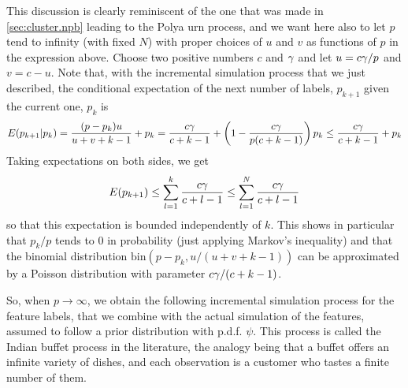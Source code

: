 \bigskip

This discussion is clearly reminiscent of the one that was made in \cref{sec:cluster.npb} leading to the Polya urn process, and we want here also to let $p$ tend to infinity (with fixed $N$) with proper choices of $u$ and $v$ as functions of $p$ in the expression above. Choose two positive numbers $c$ and $\gamma$ and let $u = c\gamma/p$ and $v = c - u$. Note that, with the incremental simulation process that we just described, the conditional expectation of the next number of labels, $p_{k+1}$ given the current one, $p_k$ is
\[
E(p_{k+1}|p_k) = \frac{(p-p_k)u}{u+v+k-1} + p_k = \frac{c\gamma}{c+k-1} + \left(1- \frac{c\gamma}{p(c+k-1)}\right) p_k\leq \frac{c\gamma}{c+k-1} + p_k 
\]
Taking expectations on both sides, we get 
\[
E(p_{k+1}) \leq \sum_{l=1}^k \frac{c\gamma}{c+l-1} \leq  \sum_{l=1}^N \frac{c\gamma}{c+l-1}
\]
so that this expectation is bounded independently of $k$. This shows in particular that $p_k/p$ tends to 0 in probability (just applying Markov's inequality) and that the binomial distribution $\mathrm{bin}(p-p_k, u/(u+v+k-1))$ can be approximated by a Poisson distribution with parameter $c\gamma / (c+k-1)$. 

So, when $p\to \infty$, we obtain the following incremental simulation process for the feature labels, that we combine with the actual simulation of the features, assumed to follow a prior distribution with p.d.f. $\psi$. This process is called the Indian buffet process in the literature, the analogy being that a buffet offers an infinite variety of dishes, and each observation is a customer who tastes a finite number of them. 

